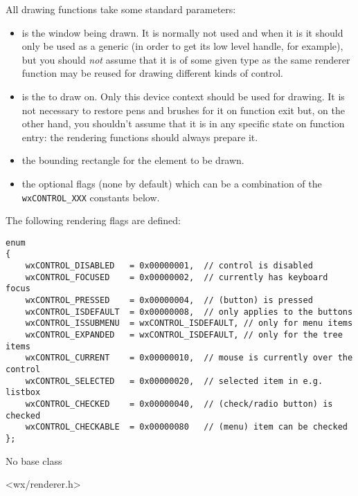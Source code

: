 All drawing functions take some standard parameters:
\begin{itemize}
\item {} is the window being drawn. It is normally not used and when
it is it should only be used as a generic  
(in order to get its low level handle, for example), but you should
\emph{not} assume that it is of some given type as the same renderer
function may be reused for drawing different kinds of control.
\item {} is the  to draw on. Only this device
context should be used for drawing. It is not necessary to restore
pens and brushes for it on function exit but, on the other hand, you
shouldn't assume that it is in any specific state on function entry:
the rendering functions should always prepare it.
\item {} the bounding rectangle for the element to be drawn.
\item {} the optional flags (none by default) which can be a
combination of the \texttt{wxCONTROL\_XXX} constants below.
\end{itemize}


The following rendering flags are defined:

\begin{verbatim}
enum
{
    wxCONTROL_DISABLED   = 0x00000001,  // control is disabled
    wxCONTROL_FOCUSED    = 0x00000002,  // currently has keyboard focus
    wxCONTROL_PRESSED    = 0x00000004,  // (button) is pressed
    wxCONTROL_ISDEFAULT  = 0x00000008,  // only applies to the buttons
    wxCONTROL_ISSUBMENU  = wxCONTROL_ISDEFAULT, // only for menu items
    wxCONTROL_EXPANDED   = wxCONTROL_ISDEFAULT, // only for the tree items
    wxCONTROL_CURRENT    = 0x00000010,  // mouse is currently over the control
    wxCONTROL_SELECTED   = 0x00000020,  // selected item in e.g. listbox
    wxCONTROL_CHECKED    = 0x00000040,  // (check/radio button) is checked
    wxCONTROL_CHECKABLE  = 0x00000080   // (menu) item can be checked
};
\end{verbatim}


No base class


<wx/renderer.h>




\label{wxrenderernativedtor}

